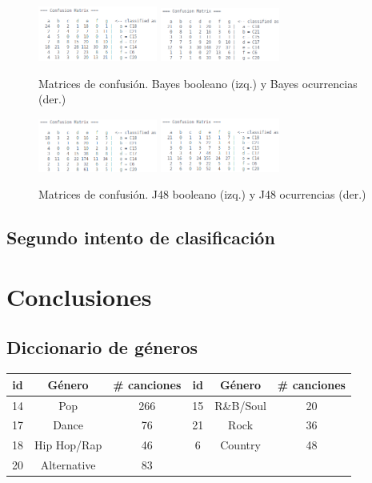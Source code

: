 \documentclass[spanish,11pt,letterpaper]{article}
\begin{document}
\begin{figure}[h]
\centering
\includegraphics[width=0.35\textwidth]{bayes_boolean}
\includegraphics[width=0.35\textwidth]{bayes_counter}
\caption{Matrices de confusión. Bayes booleano (izq.) y Bayes ocurrencias (der.)}
\end{figure}
\begin{figure}[h]
\centering
\includegraphics[width=0.35\textwidth]{j48_boolean}
\includegraphics[width=0.35\textwidth]{j48_counter}
\caption{Matrices de confusión. J48 booleano (izq.) y J48 ocurrencias (der.)}
\end{figure}

\subsection{Segundo intento de clasificación}

\section{Conclusiones}

\begin{appendices}
\section{Diccionario de géneros}
\begin{center}
\begin{tabular}{|c|c|c||c|c|c|}
\hline
id & Género & \# canciones & id & Género & \# canciones\\
\hline
14 & Pop & 266 & 15 & R\&B/Soul & 20 \\
17 & Dance & 76 & 21 & Rock & 36 \\
18 & Hip Hop/Rap & 46 & 6 & Country & 48 \\
20 & Alternative & 83 & & & \\
\hline
\end{tabular}
\end{center}
\end{appendices}
\end{document}
